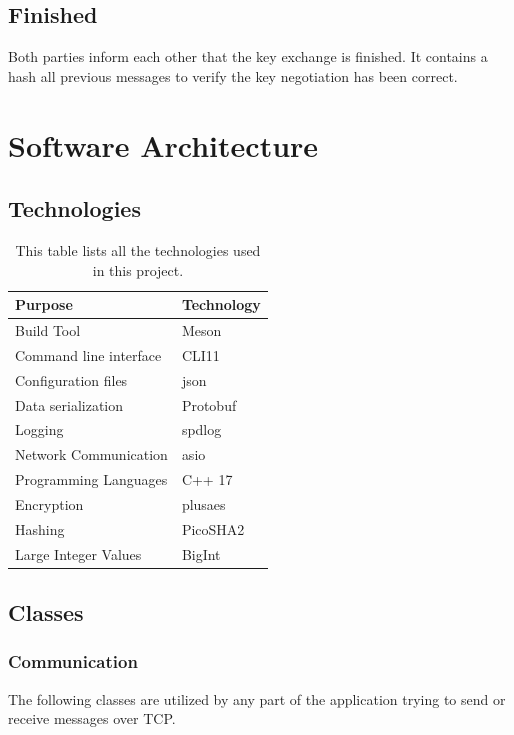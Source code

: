 \documentclass[12pt, letterpaper]{article}
\begin{document}
\subsection*{Finished}
Both parties inform each other that the key exchange is finished. It contains a hash all previous messages to verify the key negotiation has been correct.

\section{Software Architecture}

\subsection{Technologies}

\begin{table}[h]
	\centering
	\begin{tabular}{l|l}
		Purpose                       & Technology \\ \hline
		Build Tool				 	  & Meson	   \\
		Command line interface	      & CLI11      \\
		Configuration files           & json       \\
		Data serialization            & Protobuf   \\
		Logging                       & spdlog     \\
		Network Communication         & asio       \\
		Programming Languages		  & C++ 17 \\
		Encryption 					& plusaes \\
		Hashing 					& PicoSHA2 \\
		Large Integer Values & BigInt \\
	\end{tabular}
	\caption{This table lists all the technologies used in this project.}
\end{table}

\subsection{Classes}

\subsubsection{Communication}
The following classes are utilized by any part of the application trying to send or receive messages over TCP.
\end{document}
